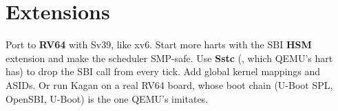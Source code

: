 \documentclass[11pt,a4paper]{article}
\begin{document}
\section{Extensions}

Port to \textbf{RV64} with Sv39, like xv6. Start more harts with the SBI \textbf{HSM} extension and make the scheduler
SMP-safe. Use \textbf{Sstc} (, which QEMU's hart has) to drop the SBI call from every tick. Add global
kernel mappings and ASIDs. Or run Kagan on a real RV64 board, whose boot chain (U-Boot SPL, OpenSBI, U-Boot) is the
one QEMU's  imitates.

\booklegend
\portlegend
\end{document}
